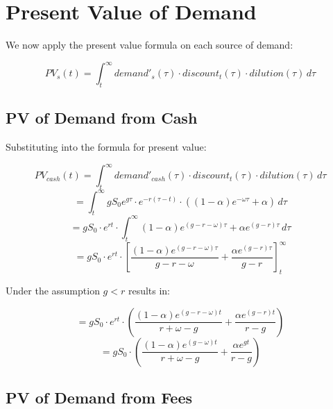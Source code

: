 \section{Present Value of Demand}

We now apply the present value formula on each source of demand:

\begin{equation}
    PV_s(t) = \int_{t}^{\infty} demand'_s(\tau) \cdot discount_t(\tau) \cdot dilution(\tau) \,d\tau
\end{equation}

\subsection{PV of Demand from Cash}

Substituting into the formula for present value:

\begin{equation}
    PV_{cash}(t) = \int_{t}^{\infty} demand'_{cash}(\tau) \cdot discount_t(\tau) \cdot dilution(\tau) \,d\tau
\end{equation}
\begin{equation}
    = \int_{t}^{\infty} gS_0e^{g\tau} \cdot e^{-r(\tau-t)} \cdot ((1-\alpha)e^{-\omega\tau} + \alpha) \,d\tau
\end{equation}
\begin{equation}
    = gS_0 \cdot e^{rt} \cdot \int_{t}^{\infty}  (1-\alpha)e^{(g-r-\omega)\tau} + \alpha e^{(g-r)\tau} \,d\tau
\end{equation}
\begin{equation}
    = gS_0 \cdot e^{rt} \cdot \left[ \frac{(1-\alpha)e^{(g-r-\omega)\tau}}{g-r-\omega} + \frac{\alpha e^{(g-r)\tau}}{g-r} \right]_{t}^{\infty}
\end{equation}

Under the assumption $g < r$ results in:

\begin{equation}
    = gS_0 \cdot e^{rt} \cdot \left( \frac{(1-\alpha)e^{(g-r-\omega)t}}{r+\omega-g} + \frac{\alpha e^{(g-r)t}}{r-g} \right)
\end{equation}
\begin{equation}
    = gS_0 \cdot \left( \frac{(1-\alpha)e^{(g-\omega)t}}{r+\omega-g} + \frac{\alpha e^{gt}}{r-g} \right)
\end{equation}


\subsection{PV of Demand from Fees}

